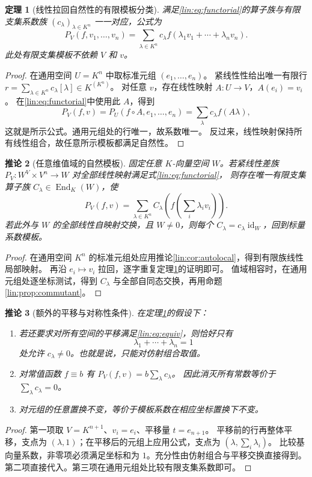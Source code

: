 \documentclass[11pt,a4paper,oneside,openany]{book}
\theoremstyle{lecture}
\newtheorem{theorem}{定理}[section]
\newtheorem{corollary}[theorem]{推论}
\newcommand{\End}{\operatorname{End}}
\newcommand{\id}{\operatorname{id}}
\numberwithin{equation}{section}
\begin{document}
\begin{theorem}[线性拉回自然性的有限模板分类]\label{lin:thm:universal}
满足\eqref{lin:eq:functorial}的算子族与有限支集系数族 $(c_\lambda)_{\lambda\in K^n}$ 一一对应，公式为
\begin{equation}\label{lin:eq:universal}
 P_V(f,v_1,\ldots,v_n)
 =\sum_{\lambda\in K^n}c_\lambda
 f(\lambda_1v_1+\cdots+\lambda_nv_n).
\end{equation}
此处有限支集模板不依赖 $V$ 和 $v$。
\end{theorem}
\begin{proof}
在通用空间 $U=K^n$ 中取标准元组 $(e_1,\ldots,e_n)$。
紧线性性给出唯一有限行
$r=\sum_{\lambda\in K^n}c_\lambda[\lambda]\in K^{(K^n)}$。
对任意 $v$，存在线性映射 $A:U\to V$，$A(e_i)=v_i$。
在\eqref{lin:eq:functorial}中使用此 $A$，得到
\[
 P_V(f,v)=P_U(f\circ A,e_1,\ldots,e_n)
 =\sum_\lambda c_\lambda f(A\lambda),
\]
这就是所示公式。通用元组处的行唯一，故系数唯一。
反过来，线性映射保持所有线性组合，故任意所示模板都满足自然性。
\end{proof}

\begin{corollary}[任意维值域的自然模板]\label{lin:cor:operatornatural}
固定任意 $K$-向量空间 $W$。若紧线性差族
$P_V:W^V\times V^n\to W$ 对全部线性映射满足式\eqref{lin:eq:functorial}，
则存在唯一有限支集算子族 $C_\lambda\in\End_K(W)$，使
\[
 P_V(f,v)=\sum_{\lambda\in K^n}C_\lambda
 \left(f\left(\sum_i\lambda_iv_i\right)\right).
\]
若此外与 $W$ 的全部线性自映射交换，且 $W\ne0$，则每个 $C_\lambda=c_\lambda\id_W$，回到标量系数模板。
\end{corollary}
\begin{proof}
在通用空间 $K^n$ 的标准元组处应用推论\ref{lin:cor:autolocal}，得到有限族线性局部映射。
再沿 $e_i\mapsto v_i$ 拉回，逐字重复定理\ref{lin:thm:universal}的证明即可。
值域相容时，在通用元组处逐坐标测试，得到 $C_\lambda$ 与全部自同态交换，再用命题\ref{lin:prop:commutant}。
\end{proof}

\begin{corollary}[额外的平移与对称性条件]\label{lin:cor:affine}
在定理\ref{lin:thm:universal}的假设下：
\begin{enumerate}
\item 若还要求对所有空间的平移满足\eqref{lin:eq:equiv}，则恰好只有
\[
 \lambda_1+\cdots+\lambda_n=1
\]
处允许 $c_\lambda\ne0$。也就是说，只能对仿射组合取值。
\item 对常值函数 $f\equiv b$ 有 $P_V(f,v)=b\sum_\lambda c_\lambda$。
因此消灭所有常数等价于 $\sum_\lambda c_\lambda=0$。
\item 对元组的任意置换不变，等价于模板系数在相应坐标置换下不变。
\end{enumerate}
\end{corollary}
\begin{proof}
第一项取 $V=K^{n+1}$、$v_i=e_i$、平移量 $t=e_{n+1}$。
平移前的行再整体平移，支点为 $(\lambda,1)$；在平移后的元组上应用公式，支点为 $(\lambda,\sum_i\lambda_i)$。
比较基向量系数，非零项必须满足坐标和为 $1$。充分性由仿射组合与平移交换直接得到。
第二项直接代入。第三项在通用元组处比较有限支集系数即可。
\end{proof}
\end{document}
